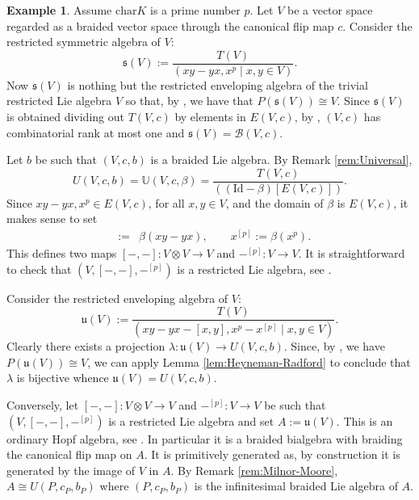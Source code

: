 \documentclass[english]{amsart}
\numberwithin{equation}{section}
\numberwithin{figure}{section}
\theoremstyle{plain}
\theoremstyle{definition}
\theoremstyle{definition}
\newtheorem{example}[thm]{Example}
\theoremstyle{remark}
\theoremstyle{remark}
\theoremstyle{plain}
\theoremstyle{plain}
\theoremstyle{plain}
\begin{document}
\begin{example}
\label{exa:RestrictedLie}Assume $\mathrm{char}K$ is a prime number
$p$. Let $V$ be a vector space regarded as a braided vector space
through the canonical flip map $c$. Consider the restricted symmetric
algebra of $V$:\[
\mathfrak{s}(V):=\frac{T(V)}{(xy-yx,x^{p}\mid x,y\in V)}.\]
Now $\mathfrak{s}(V)$ is nothing but the restricted enveloping algebra
of the trivial restricted Lie algebra $V$ so that, by \cite[Theorem 6.11]{Milnor-Moore},
we have that $P(\mathfrak{s}(V))\cong V$. Since $\mathfrak{s}(V)$
is obtained dividing out $T(V,c)$ by elements in $E(V,c)$, by \cite[Theorem 6.1 and Remark 4.3]{Ardizzoni-Sdeg},
$\left(V,c\right)$ has combinatorial rank at most one and $\mathfrak{s}(V)=\mathcal{B}\left(V,c\right)$.

Let $b$ be such that $(V,c,b)$ is a braided Lie algebra. By Remark
\ref{rem:Universal}, \[
U\left(V,c,b\right)=\mathbb{U}\left(V,c,\beta\right)=\frac{T(V,c)}{\left((\mathrm{Id}-\beta)[E\left(V,c\right)]\right)}.\]
Since $xy-yx,x^{p}\in E(V,c)$, for all $x,y\in V$, and the domain
of $\beta$ is $E\left(V,c\right)$, it makes sense to set \begin{eqnarray*}
[x,y] & := & \beta(xy-yx),\qquad x^{[p]}:=\beta(x^{p}).\end{eqnarray*}
This defines two maps $[-,-]:V\otimes V\rightarrow V$ and $-{}^{[p]}:V\rightarrow V$.
It is straightforward to check that $(V,[-,-],-{}^{[p]})$ is a restricted
Lie algebra, see \cite[Definition 4, page 187]{Jacobson-LieAlg}.

{}Consider the restricted enveloping algebra of $V$: \[
\mathfrak{u}(V):=\frac{T(V)}{\left(xy-yx-[x,y],x^{p}-x^{[p]}\mid x,y\in V\right)}.\]
Clearly there exists a projection $\lambda:\mathfrak{u}(V)\rightarrow U\left(V,c,b\right)$.
Since, by \cite[Theorem 6.11]{Milnor-Moore}, we have $P(\mathfrak{u}(V))\cong V$,
we can apply Lemma \ref{lem:Heyneman-Radford} to conclude that $\lambda$
is bijective whence $\mathfrak{u}(V)=U\left(V,c,b\right)$.

Conversely, let $[-,-]:V\otimes V\rightarrow V$ and $-{}^{[p]}:V\rightarrow V$
be such that $(V,[-,-],-{}^{[p]})$ is a restricted Lie algebra and
set $A:=\mathfrak{u}(V)$. This is an ordinary Hopf algebra, see \cite[page 23]{Montgomery}.
In particular it is a braided bialgebra with braiding the canonical
flip map on $A$. It is primitively generated as, by construction
it is generated by the image of $V$ in $A$. By Remark \ref{rem:Milnor-Moore},
$A\cong U\left(P,c_{P},b_{P}\right)$ where $\left(P,c_{P},b_{P}\right)$
is the infinitesimal braided Lie algebra of $A$. 


\end{example}
\end{document}
